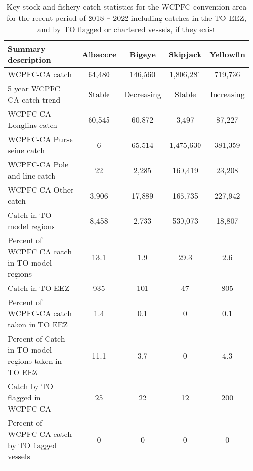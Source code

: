 \begin{longtable}{lcccc}
\caption{Key stock and fishery catch statistics for the WCPFC convention area for the recent period of 2018 -- 2022 including catches in the TO EEZ, and by TO flagged or chartered vessels, if they exist} \\ 
  \hline
Summary description & Albacore & Bigeye & Skipjack & Yellowfin \\ 
  \hline
WCPFC-CA catch & 64,480 & 146,560 & 1,806,281 & 719,736 \\ 
  5-year WCPFC-CA catch trend & Stable & Decreasing & Stable & Increasing \\ 
  WCPFC-CA Longline catch & 60,545 & 60,872 & 3,497 & 87,227 \\ 
  WCPFC-CA Purse seine catch & 6 & 65,514 & 1,475,630 & 381,359 \\ 
  WCPFC-CA Pole and line catch & 22 & 2,285 & 160,419 & 23,208 \\ 
  WCPFC-CA Other catch & 3,906 & 17,889 & 166,735 & 227,942 \\ 
  Catch in TO model regions & 8,458 & 2,733 & 530,073 & 18,807 \\ 
  Percent of WCPFC-CA catch in TO model regions & 13.1 & 1.9 & 29.3 & 2.6 \\ 
   \hline
Catch in TO EEZ & 935 & 101 & 47 & 805 \\ 
  Percent of WCPFC-CA catch taken in TO EEZ & 1.4 & 0.1 & 0 & 0.1 \\ 
  Percent of Catch in TO model regions taken in TO EEZ & 11.1 & 3.7 & 0 & 4.3 \\ 
  Catch by TO flagged in WCPFC-CA & 25 & 22 & 12 & 200 \\ 
  Percent of WCPFC-CA catch by TO flagged vessels & 0 & 0 & 0 & 0 \\ 
  \hline
\label{cat_sum_tab}
\end{longtable}
